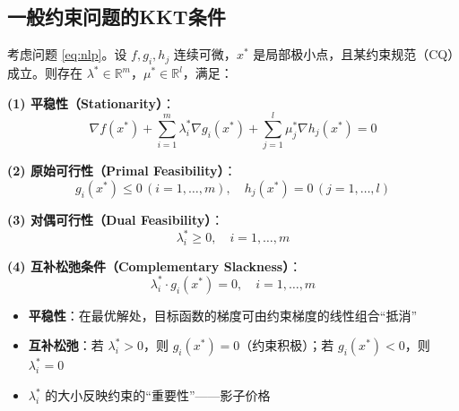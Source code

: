 \subsection{一般约束问题的KKT条件}\label{sec:kkt-general}

\begin{kktbox}[KKT一阶必要条件]
考虑问题 \eqref{eq:nlp}。设 $f, g_i, h_j$ 连续可微，$x^*$ 是局部极小点，且某约束规范（CQ）成立。则存在 $\lambda^* \in \mathbb{R}^m$，$\mu^* \in \mathbb{R}^l$，满足：

\textbf{(1) 平稳性（Stationarity）}：
\[
\nabla f(x^*) + \sum_{i=1}^m \lambda_i^* \nabla g_i(x^*) + \sum_{j=1}^l \mu_j^* \nabla h_j(x^*) = 0
\]

\textbf{(2) 原始可行性（Primal Feasibility）}：
\[
g_i(x^*) \leq 0 \, (i=1,\ldots,m), \quad h_j(x^*) = 0 \, (j=1,\ldots,l)
\]

\textbf{(3) 对偶可行性（Dual Feasibility）}：
\[
\lambda_i^* \geq 0, \quad i = 1, \ldots, m
\]

\textbf{(4) 互补松弛条件（Complementary Slackness）}：
\[
\lambda_i^* \cdot g_i(x^*) = 0, \quad i = 1, \ldots, m
\]
\end{kktbox}

\begin{conceptbox}[KKT条件的直观理解]
\begin{itemize}
    \item \textbf{平稳性}：在最优解处，目标函数的梯度可由约束梯度的线性组合``抵消''
    \item \textbf{互补松弛}：若 $\lambda_i^* > 0$，则 $g_i(x^*) = 0$（约束积极）；若 $g_i(x^*) < 0$，则 $\lambda_i^* = 0$
    \item $\lambda_i^*$ 的大小反映约束的``重要性''——影子价格
\end{itemize}
\end{conceptbox}


